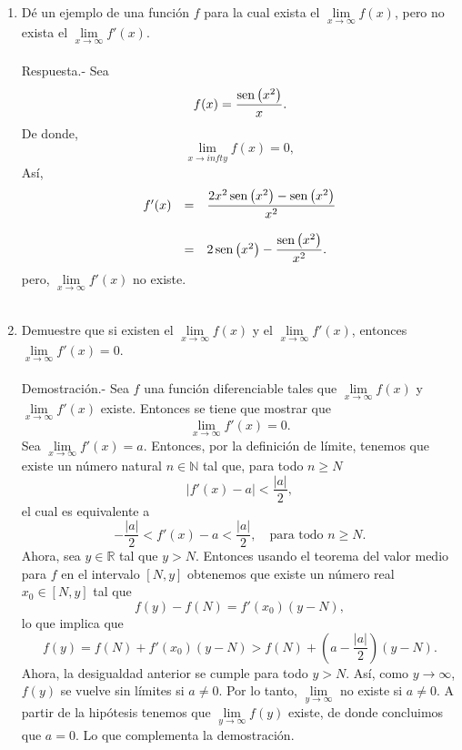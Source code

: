 \begin{enumerate}[\bfseries 1.]
\begin{enumerate}
	    \item Dé un ejemplo de una función $f$ para la cual exista el $\lim\limits_{x\to \infty}f(x)$, pero no exista el $\lim\limits_{x\to \infty}f'(x)$.\\\\
		Respuesta.-\; Sea 
		$$f(x)=\dfrac{\mathop{\mbox{\normalfont sen}}\nolimits\left(x^2\right)}{x}.$$
		De donde,
		$$\lim_{x\to infty}f(x)=0,$$
		Así,
		$$\begin{array}{rcl}
		    f'(x) &=& \dfrac{2x^2\mathop{\mbox{\normalfont sen}}\nolimits\left(x^2\right)-\mathop{\mbox{\normalfont sen}}\nolimits\left(x^2\right)}{x^2}\\\\
			  &=& 2\mathop{\mbox{\normalfont sen}}\nolimits\left(x^2\right)-\dfrac{\mathop{\mbox{\normalfont sen}}\nolimits\left(x^2\right)}{x^2}.
	    \end{array}$$
	    pero, $\lim\limits_{x\to \infty}f'(x)$ no existe.\\\\


	    \item Demuestre que si existen el $\lim\limits_{x\to \infty} f(x)$ y el $\lim\limits_{x\to \infty}f'(x)$, entonces $\lim\limits_{x\to \infty}f'(x)=0$.\\\\
		Demostración.-\; Sea $f$ una función diferenciable tales que $\lim\limits_{x\to \infty} f(x)$ y $\lim\limits_{x\to \infty}f'(x)$ existe. Entonces se tiene que mostrar que
		$$\lim_{x\to \infty}f'(x)=0.$$
		Sea $\lim\limits_{x\to \infty}f'(x)=a.$ Entonces, por la definición de límite, tenemos que existe un número natural $n\in \mathbb{N}$ tal que, para todo $n\geq N$
		$$|f'(x)-a|<\dfrac{|a|}{2},$$
		el cual es equivalente a
		$$-\dfrac{|a|}{2}<f'(x)-a<\dfrac{|a|}{2},\quad \mbox{para todo } n\geq N.$$
		Ahora, sea $y\in \mathbb{R}$ tal que $y>N$. Entonces usando el teorema del valor medio para $f$ en el intervalo $[N,y]$ obtenemos que existe un número real $x_0\in [N,y]$ tal que
		$$f(y)-f(N)=f'(x_0)(y-N),$$
		lo que implica que
		$$f(y)=f(N)+f'(x_0)(y-N)>f(N)+\left(a-\dfrac{|a|}{2}\right)(y-N).$$
		Ahora, la desigualdad anterior se cumple para todo $y>N$. Así, como $y\to \infty$, $f(y)$ se vuelve sin límites si $a\neq 0$. Por lo tanto, $\lim\limits_{y\to \infty}$ no existe si $a\neq 0$. A partir de la hipótesis tenemos que $\lim\limits_{y\to \infty}f(y)$ existe, de donde concluimos que $a=0$. Lo que complementa la demostración.\\\\


\end{enumerate}
\end{enumerate}
